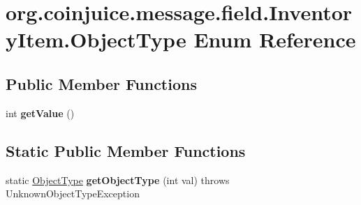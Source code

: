 \hypertarget{enumorg_1_1coinjuice_1_1message_1_1field_1_1_inventory_item_1_1_object_type}{\section{org.\-coinjuice.\-message.\-field.\-Inventory\-Item.\-Object\-Type Enum Reference}
\label{enumorg_1_1coinjuice_1_1message_1_1field_1_1_inventory_item_1_1_object_type}
}
\subsection*{Public Member Functions}
\begin{DoxyCompactItemize}
\item 
\hypertarget{enumorg_1_1coinjuice_1_1message_1_1field_1_1_inventory_item_1_1_object_type_ae9d55f7eadbfee4d250a10bd242d5969}{int {\bfseries get\-Value} ()}\label{enumorg_1_1coinjuice_1_1message_1_1field_1_1_inventory_item_1_1_object_type_ae9d55f7eadbfee4d250a10bd242d5969}

\end{DoxyCompactItemize}
\subsection*{Static Public Member Functions}
\begin{DoxyCompactItemize}
\item 
\hypertarget{enumorg_1_1coinjuice_1_1message_1_1field_1_1_inventory_item_1_1_object_type_ae2fb05389dfbfc2745071c60700d1468}{static \hyperlink{enumorg_1_1coinjuice_1_1message_1_1field_1_1_inventory_item_1_1_object_type}{Object\-Type} {\bfseries get\-Object\-Type} (int val)  throws Unknown\-Object\-Type\-Exception }\label{enumorg_1_1coinjuice_1_1message_1_1field_1_1_inventory_item_1_1_object_type_ae2fb05389dfbfc2745071c60700d1468}

\end{DoxyCompactItemize}
